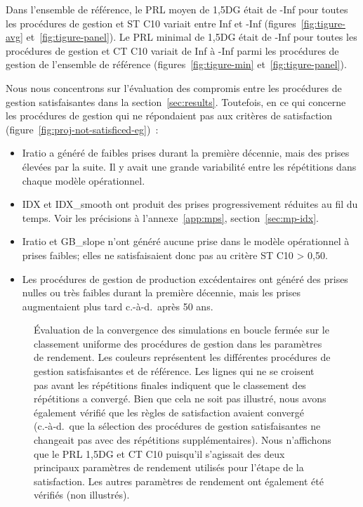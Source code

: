 \documentclass[french,11pt]{book}
\begin{document}
Dans l'ensemble de référence, le PRL moyen de 1,5DG était de -Inf pour toutes les procédures de gestion et ST C10 variait entre Inf et -Inf (figures~\ref{fig:tigure-avg} et~\ref{fig:tigure-panel}). Le PRL minimal de 1,5DG était de -Inf pour toutes les procédures de gestion et CT C10 variait de Inf à -Inf parmi les procédures de gestion de l'ensemble de référence (figures~\ref{fig:tigure-min} et~\ref{fig:tigure-panel}).

Nous nous concentrons sur l'évaluation des compromis entre les procédures de gestion satisfaisantes dans la section~\ref{sec:results}. Toutefois, en ce qui concerne les procédures de gestion qui ne répondaient pas aux critères de satisfaction (figure~\ref{fig:proj-not-satisficed-eg})~:
\begin{itemize}

\item
  Iratio a généré de faibles prises durant la première décennie, mais des prises élevées par la suite. Il y avait une grande variabilité entre les répétitions dans chaque modèle opérationnel.
\item
  IDX et IDX\_smooth ont produit des prises progressivement réduites au fil du temps. Voir les précisions à l'annexe~\ref{app:mps}, section~\ref{sec:mp-idx}.
\item
  Iratio et GB\_slope n'ont généré aucune prise dans le modèle opérationnel à prises faibles; elles ne satisfaisaient donc pas au critère ST C10 \textgreater{} 0,50.
\item
  Les procédures de gestion de production excédentaires ont généré des prises nulles ou très faibles durant la première décennie, mais les prises augmentaient plus tard c.-à-d.~après 50 ans.
\end{itemize}

\begin{figure}[htb]

{\centering {} 

}

\caption{Évaluation de la convergence des simulations en boucle fermée sur le classement uniforme des procédures de gestion dans les paramètres de rendement. Les couleurs représentent les différentes procédures de gestion satisfaisantes et de référence. Les lignes qui ne se croisent pas avant les répétitions finales indiquent que le classement des répétitions a convergé. Bien que cela ne soit pas illustré, nous avons également vérifié que les règles de satisfaction avaient convergé (c.‑à‑d.~que la sélection des procédures de gestion satisfaisantes ne changeait pas avec des répétitions supplémentaires). Nous n'affichons que le PRL 1,5DG et CT C10 puisqu'il s'agissait des deux principaux paramètres de rendement utilisés pour l'étape de la satisfaction. Les autres paramètres de rendement ont également été vérifiés (non illustrés).}\label{fig:converge}
\end{figure}
\end{document}
